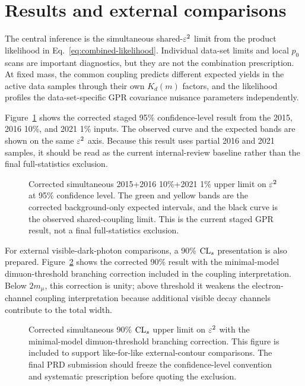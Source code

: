 \section{Results and external comparisons}
\label{sec:results}

The central inference is the simultaneous shared-$\varepsilon^2$ limit from the product
likelihood in Eq.~\eqref{eq:combined-likelihood}. Individual data-set limits and
local $p_0$ scans are important diagnostics, but they are not the combination
prescription. At fixed mass, the common coupling predicts different expected yields in
the active data samples through their own $K_d(m)$ factors, and the likelihood profiles
the data-set-specific GPR covariance nuisance parameters independently.

Figure~\ref{fig:combined-95} shows the corrected staged 95\% confidence-level result
from the 2015, 2016 10\%, and 2021 1\% inputs. The observed curve and the expected
bands are shown on the same $\varepsilon^2$ axis. Because this result uses partial 2016 and
2021 samples, it should be read as the current internal-review baseline rather than
the final full-statistics exclusion.

\begin{figure}[t]
\centering
{}
\caption{Corrected simultaneous 2015+2016 10\%+2021 1\% upper limit on $\varepsilon^2$ at
95\% confidence level. The green and yellow bands are the corrected background-only
expected intervals, and the black curve is the observed shared-coupling limit. This is
the current staged GPR result, not a final full-statistics exclusion.}
\label{fig:combined-95}
\end{figure}

For external visible-dark-photon comparisons, a 90\% $\mathrm{CL}_{s}$ presentation is also
prepared. Figure~\ref{fig:combined-90} shows the corrected 90\% result with the
minimal-model dimuon-threshold branching correction included in the coupling
interpretation. Below $2m_\mu$, this correction is unity; above threshold it weakens
the electron-channel coupling interpretation because additional visible decay channels
contribute to the total width.

\begin{figure}[t]
\centering
{}
\caption{Corrected simultaneous 90\% $\mathrm{CL}_{s}$ upper limit on $\varepsilon^2$ with the
minimal-model dimuon-threshold branching correction. This figure is included to support
like-for-like external-contour comparisons. The final PRD submission should freeze the
confidence-level convention and systematic prescription before quoting the exclusion.}
\label{fig:combined-90}
\end{figure}


